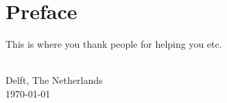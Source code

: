\chapter{Preface}
\label{ch:preface}

This is where you thank people for helping you etc.


\vskip1cm
\begin{flushright}
\theauthor\\
Delft, The Netherlands \\
\today\\
\end{flushright}

